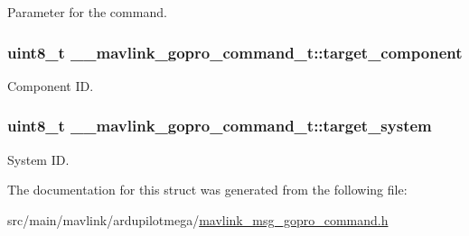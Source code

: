 Parameter for the command. 

\hypertarget{struct____mavlink__gopro__command__t_a701c31ece8efb655227348e9d9a1a6e6}{
\subsubsection[{target\+\_\+component}]{\setlength{\rightskip}{0pt plus 5cm}uint8\+\_\+t \+\_\+\+\_\+mavlink\+\_\+gopro\+\_\+command\+\_\+t\+::target\+\_\+component}}\label{struct____mavlink__gopro__command__t_a701c31ece8efb655227348e9d9a1a6e6}


Component I\+D. 

\hypertarget{struct____mavlink__gopro__command__t_a4c14b6850bc265e04586ea2a2fa1a2ff}{
\subsubsection[{target\+\_\+system}]{\setlength{\rightskip}{0pt plus 5cm}uint8\+\_\+t \+\_\+\+\_\+mavlink\+\_\+gopro\+\_\+command\+\_\+t\+::target\+\_\+system}}\label{struct____mavlink__gopro__command__t_a4c14b6850bc265e04586ea2a2fa1a2ff}


System I\+D. 



The documentation for this struct was generated from the following file\+:\begin{DoxyCompactItemize}
\item 
src/main/mavlink/ardupilotmega/\hyperlink{mavlink__msg__gopro__command_8h}{mavlink\+\_\+msg\+\_\+gopro\+\_\+command.\+h}\end{DoxyCompactItemize}
